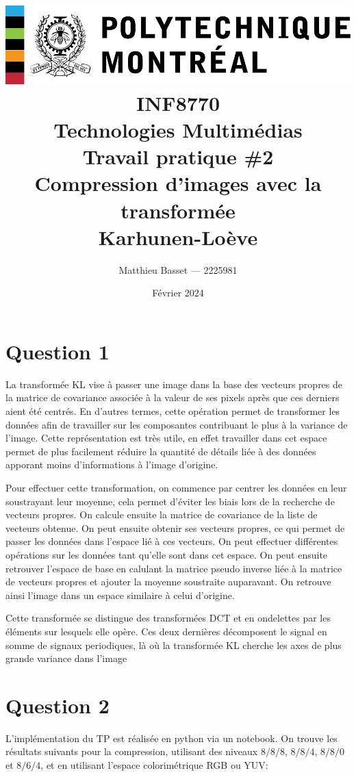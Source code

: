 \documentclass{article}[letterpaper, 11pt]
\title{
    \includegraphics[scale=0.8]{poly-logo.pdf}\\\vspace*{50pt}
    \huge\textbf{INF8770}\\
    \textbf{Technologies Multimédias}\\
    Travail pratique \#2\\
    Compression d'images avec la transformée \\Karhunen-Loève\\
}
\author{\Large Matthieu Basset --- 2225981}
\date{\huge Février 2024}
\renewcommand{\thepage}{}
\begin{document}
\thispagestyle{empty}
\maketitle

\newpage

\renewcommand{\thepage}{\arabic{page}}
\pagestyle{fancy}
\renewcommand{\contentsname}{Table des matières}
\setcounter{page}{1}

\tableofcontents


\newpage
\section{Question 1}
La transformée KL vise à passer une image dans la base des vecteurs propres de la matrice de covariance associée à la valeur de ses pixels après que ces derniers aient été centrés. En d'autres termes, cette opération permet de transformer les données afin de travailler sur les composantes contribuant le plus à la variance de l'image. Cette représentation est très utile, en effet travailler dans cet espace permet de plus facilement réduire la quantité de détails liée à des données apporant moins d'informations à l'image d'origine.

Pour effectuer cette transformation, on commence par centrer les données en leur soustrayant leur moyenne, cela permet d'éviter les biais lors de la recherche de vecteurs propres. On calcule ensuite la matrice de covariance de la liste de vecteurs obtenue. On peut ensuite obtenir ses vecteurs propres, ce qui permet de passer les données dans l'espace lié à ces vecteurs. On peut effectuer différentes opérations sur les données tant qu'elle sont dans cet espace. On peut ensuite retrouver l'espace de base en calulant la matrice pseudo inverse liée à la matrice de vecteurs propres et ajouter la moyenne soustraite auparavant. On retrouve ainsi l'image dans un espace similaire à celui d'origine.

Cette transformée se distingue des transformées DCT et en ondelettes par les éléments sur lesquels elle opère. Ces deux dernières décomposent le signal en somme de signaux periodiques, là où la transformée KL cherche les axes de plus grande variance dans l'image

\newpage
\section{Question 2}

L'implémentation du TP est réalisée en python via un notebook. On trouve les résultats suivants pour la compression, utilisant des niveaux $8/8/8$, $8/8/4$, $8/8/0$ et $8/6/4$, et en utilisant l'espace colorimétrique RGB ou YUV:\@
\end{document}
